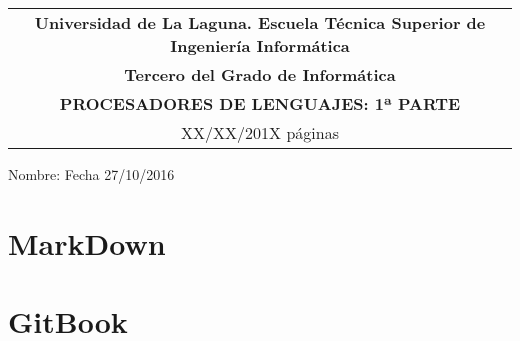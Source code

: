 \documentclass[]{article}
\date{}
\begin{document}
\thispagestyle{empty}
  \begin{tabular}{c}
   {\bf Universidad de La Laguna.  Escuela Técnica Superior de Ingeniería Informática}     \\
   {\bf Tercero del Grado de Informática}\\
   {\bf PROCESADORES DE LENGUAJES: 1ª PARTE}\\
   XX/XX/201X  \pageref*{LastPage} páginas         \\   
  \end{tabular}                     %

\bigskip

Nombre:  \underline{\hspace{11.5cm}} Fecha 27/10/2016\underline{\hspace{2cm}} 
\bigskip





\section{MarkDown}


\section{GitBook}

\end{document}
